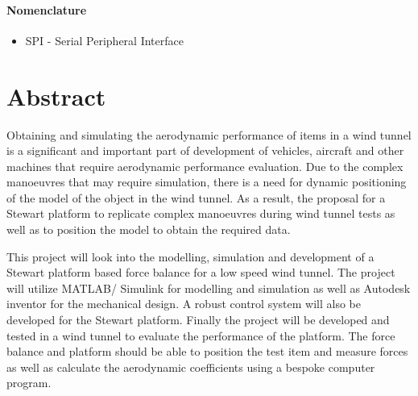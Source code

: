 \paragraph{Nomenclature}
\begin{itemize}
\item SPI - Serial Peripheral Interface
\end{itemize}
\pagebreak
{}

\section*{Abstract}
\label{sec:Abstract}
Obtaining and simulating the aerodynamic performance of items in a wind tunnel is a
significant and important part of development of vehicles, aircraft and other machines
that require aerodynamic performance evaluation. Due to the complex manoeuvres
that may require simulation, there is a need for dynamic positioning of the model of the object in the wind tunnel. As a result, the proposal for a Stewart platform to
replicate complex manoeuvres during wind tunnel tests as well as to position the model to
obtain the required data.

This project will look into the modelling, simulation and development of a Stewart
platform based force balance for a low speed wind tunnel. The project will utilize
MATLAB/ Simulink for modelling and simulation as well as Autodesk inventor for the mechanical
design. A robust control system will also be developed for the Stewart platform.
Finally the project will be developed and tested in a wind tunnel to evaluate the performance
of the platform. The force balance and platform should be able to position the test
item and measure forces as well as calculate the aerodynamic coefficients using a bespoke computer program.




